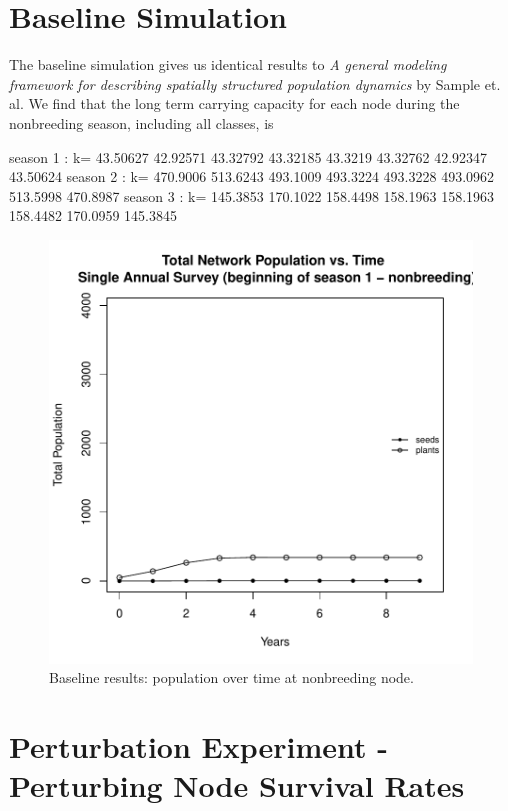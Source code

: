 \documentclass[10pt]{article}
\begin{document}
\section{Baseline Simulation}
% 
The baseline simulation gives us identical results to {\it{A general modeling framework for describing spatially
structured population dynamics}} by Sample et. al. We find that the long term carrying capacity for each node during the nonbreeding season, including all classes, is

\begin{Schunk}
\begin{Soutput}
season 1 : k= 43.50627 42.92571 43.32792 43.32185 43.3219 43.32762 42.92347 43.50624
season 2 : k= 470.9006 513.6243 493.1009 493.3224 493.3228 493.0962 513.5998 470.8987
season 3 : k= 145.3853 170.1022 158.4498 158.1963 158.1963 158.4482 170.0959 145.3845
\end{Soutput}
\end{Schunk}



\begin{figure}[H]
\begin{center}
\includegraphics[width=.7\textwidth, height=.6\textwidth]{RGraphics-plantbaseline}
\caption{Baseline results: population over time at nonbreeding node.}\label{fig:plantbaseline}
\end{center}
\end{figure}

\clearpage


\section{Perturbation Experiment - Perturbing Node Survival Rates}
\end{document}
